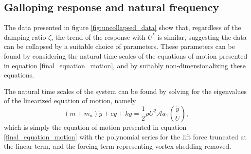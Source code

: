 \subsection{Galloping response and natural frequency}
 
 

The data presented in figure \ref{fig:uncollapsed_data} show that, regardless of the damping ratio $\zeta$, the trend of the response with $U^*$ is similar, suggesting the data can be collapsed by a suitable choice of parameters. These parameters can be found by considering the natural time scales of the equations of motion presented in equation \ref{final_equation_motion}, and by suitably non-dimensionalizing these equations.

The natural time scales of the system can be found by solving for the eigenvalues of the linearized equation of motion, namely
\begin{equation}
\label{eqn:eom_linear}
(m{+}m_a)\ddot{y}{+}c\dot{y}{+}ky{=}\frac{1}{2}\rho U^2 \mathcal{A} a_1\left(\frac{\dot{y}}{U}\right),
\end{equation}
which is simply the equation of motion presented in equation \ref{final_equation_motion} with the polynomial series for the lift force truncated at the linear term, and the forcing term representing vortex shedding removed.

